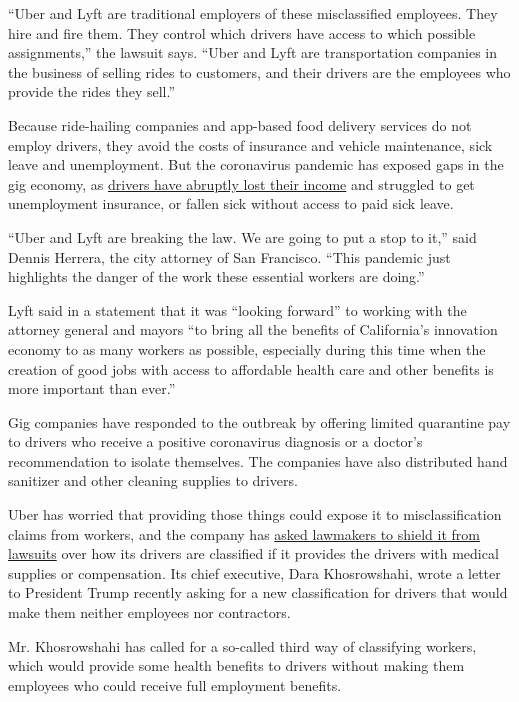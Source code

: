 ``Uber and Lyft are traditional employers of these misclassified
employees. They hire and fire them. They control which drivers have
access to which possible assignments,'' the lawsuit says. ``Uber and
Lyft are transportation companies in the business of selling rides to
customers, and their drivers are the employees who provide the rides
they sell.''

Because ride-hailing companies and app-based food delivery services do
not employ drivers, they avoid the costs of insurance and vehicle
maintenance, sick leave and unemployment. But the coronavirus pandemic
has exposed gaps in the gig economy, as
\href{https://www.nytimes3xbfgragh.onion/2020/03/18/technology/gig-economy-pandemic.html}{drivers
have abruptly lost their income} and struggled to get unemployment
insurance, or fallen sick without access to paid sick leave.

``Uber and Lyft are breaking the law. We are going to put a stop to
it,'' said Dennis Herrera, the city attorney of San Francisco. ``This
pandemic just highlights the danger of the work these essential workers
are doing.''

Lyft said in a statement that it was ``looking forward'' to working with
the attorney general and mayors ``to bring all the benefits of
California's innovation economy to as many workers as possible,
especially during this time when the creation of good jobs with access
to affordable health care and other benefits is more important than
ever.''

Gig companies have responded to the outbreak by offering limited
quarantine pay to drivers who receive a positive coronavirus diagnosis
or a doctor's recommendation to isolate themselves. The companies have
also distributed hand sanitizer and other cleaning supplies to drivers.

Uber has worried that providing those things could expose it to
misclassification claims from workers, and the company has
\href{https://www.nytimes3xbfgragh.onion/2020/04/03/technology/virus-tech-lobbyists-gains.html}{asked
lawmakers to shield it from lawsuits} over how its drivers are
classified if it provides the drivers with medical supplies or
compensation. Its chief executive, Dara Khosrowshahi, wrote a letter to
President Trump recently asking for a new classification for drivers
that would make them neither employees nor contractors.

Mr. Khosrowshahi has called for a so-called third way of classifying
workers, which would provide some health benefits to drivers without
making them employees who could receive full employment benefits.

